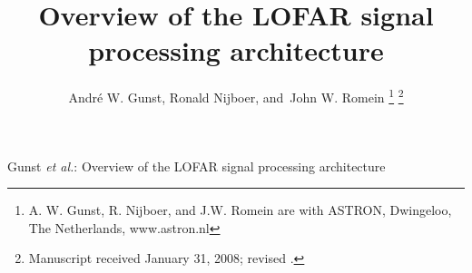 \documentclass[journal]{IEEEtran}
\begin{document}
%
\title{Overview of the LOFAR signal processing architecture}
%
%
%

\author{Andr\'{e} W. Gunst,
        Ronald Nijboer,
        and~John W. Romein%
\thanks{A. W. Gunst, R. Nijboer, and J.W. Romein are with ASTRON, Dwingeloo, 
The Netherlands, www.astron.nl
}%
\thanks{Manuscript received January 31, 2008; revised .}}

% 
%



%
{Gunst \MakeLowercase{\textit{et al.}}: Overview of the LOFAR signal processing architecture}
% 
\end{document}
